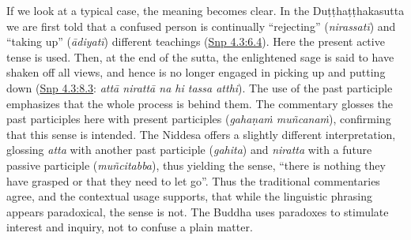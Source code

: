 \documentclass[12pt,openany]{book}%
\begin{document}
If we look at a typical case, the meaning becomes clear. In the \textsanskrit{Duṭṭhaṭṭhakasutta} we are first told that a confused person is continually “rejecting” (\textit{\textsanskrit{nirassatī}}) and “taking up” (\textit{\textsanskrit{ādiyatī}}) different teachings (\href{https://suttacentral.net/snp4.3/en/sujato\#6.4}{Snp 4.3:6.4}). Here the present active tense is used. Then, at the end of the sutta, the enlightened sage is said to have shaken off all views, and hence is no longer engaged in picking up and putting down (\href{https://suttacentral.net/snp4.3/en/sujato\#8.3}{Snp 4.3:8.3}: \textit{\textsanskrit{attā} \textsanskrit{nirattā} na hi tassa atthi}). The use of the past participle emphasizes that the whole process is behind them. The commentary glosses the past participles here with present participles (\textit{\textsanskrit{gahaṇaṁ} \textsanskrit{muñcanaṁ}}), confirming that this sense is intended. The Niddesa offers a slightly different interpretation, glossing \textit{atta} with another past participle (\textit{gahita}) and \textit{niratta} with a future passive participle (\textit{\textsanskrit{muñcitabba}}), thus yielding the sense, “there is nothing they have grasped or that they need to let go”. Thus the traditional commentaries agree, and the contextual usage supports, that while the linguistic phrasing appears paradoxical, the sense is not. The Buddha uses paradoxes to stimulate interest and inquiry, not to confuse a plain matter.
\end{document}
